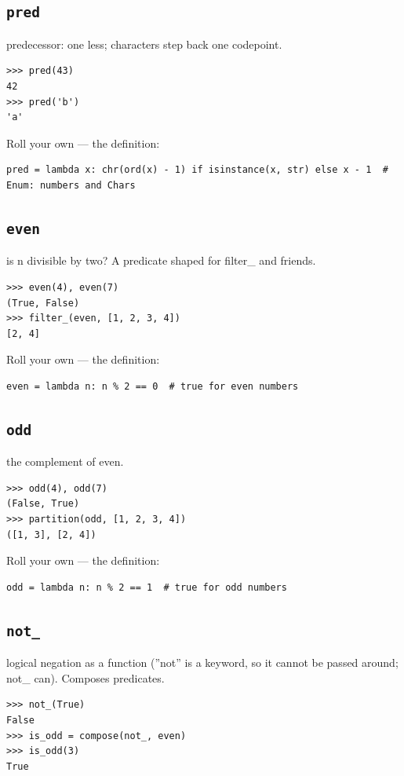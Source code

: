 \documentclass[10pt,letterpaper]{book}
\begin{document}
\subsection{\texttt{pred}}\label{def:pred}
predecessor: one less; characters step back one codepoint.
\begin{lstlisting}[style=ex]
>>> pred(43)
42
>>> pred('b')
'a'
\end{lstlisting}

Roll your own --- the definition:

\begin{lstlisting}[style=ex]
pred = lambda x: chr(ord(x) - 1) if isinstance(x, str) else x - 1  # Enum: numbers and Chars
\end{lstlisting}
\subsection{\texttt{even}}\label{def:even}
is n divisible by two? A predicate shaped for filter\_ and friends.
\begin{lstlisting}[style=ex]
>>> even(4), even(7)
(True, False)
>>> filter_(even, [1, 2, 3, 4])
[2, 4]
\end{lstlisting}

Roll your own --- the definition:

\begin{lstlisting}[style=ex]
even = lambda n: n % 2 == 0  # true for even numbers
\end{lstlisting}

\subsection{\texttt{odd}}\label{def:odd}
the complement of even.
\begin{lstlisting}[style=ex]
>>> odd(4), odd(7)
(False, True)
>>> partition(odd, [1, 2, 3, 4])
([1, 3], [2, 4])
\end{lstlisting}

Roll your own --- the definition:

\begin{lstlisting}[style=ex]
odd = lambda n: n % 2 == 1  # true for odd numbers
\end{lstlisting}

\subsection{\texttt{not\_}}\label{def:not-}
logical negation as a function (''not'' is a keyword, so it cannot be passed around; not\_ can). Composes predicates.
\begin{lstlisting}[style=ex]
>>> not_(True)
False
>>> is_odd = compose(not_, even)
>>> is_odd(3)
True
\end{lstlisting}
\end{document}
